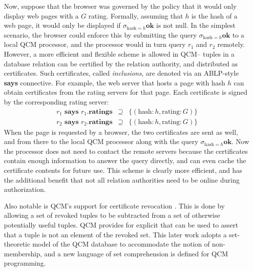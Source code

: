 Now, suppose that the browser was governed by the policy that it would
only display web pages with a $G$ rating.  Formally, assuming that $h$
is the hash of a web page, it would only be displayed if
$\sigma_{\text{hash}=h}\textbf{ok}$ is not null.  In the simplest
scenario, the browser could enforce this by submitting the query
$\sigma_{\text{hash}=h}\textbf{ok}$ to a local QCM processor, and
the processor would in turn query $r_1$ and $r_2$ remotely.  However,
a more efficient and flexible scheme is allowed in QCM-- tuples in a
database relation can be certified by the relation authority, and
distributed as certificates.  Such certificates, called 
\emph{inclusions}, are denoted via an
ABLP-style \textbf{says} connective.  For example, the web server
that hosts a page with hash $h$ can obtain certificates from the
rating servers for that page. Each certificate is signed by the
corresponding rating server:
\begin{eqnarray*}
r_1\,\,\textbf{says}\,\,r_1.\textbf{ratings} & \supseteq &
   \{(\text{hash}: h, \text{rating}: G)\} \\
r_2\,\,\textbf{says}\,\,r_2.\textbf{ratings} & \supseteq &
   \{(\text{hash}: h, \text{rating}: G)\} 
\end{eqnarray*}
When the page is requested by a browser, the two certificates are sent
as well, and from there to the local QCM processor along with the
query $\sigma_{\text{hash}=h}\textbf{ok}$.  Now the processor does
not need to contact the remote servers because the certificates
contain enough information to answer the query directly, and can even
cache the certificate contents for future use.  This scheme is clearly
more efficient, and has the additional benefit that not all relation
authorities need to be online during authorization.

Also notable is QCM's support for certificate revocation
\cite{Gunter:GCR}. This is done by allowing a set of revoked tuples to
be subtracted from a set of otherwise potentially useful tuples. QCM
provides for explicit  that can
be used to assert that a tuple is not an element of the revoked set.
This later work adopts a set-theoretic model of the QCM database to
accommodate the notion of non-membership, and a new language of set
comprehension is defined for QCM programming.

